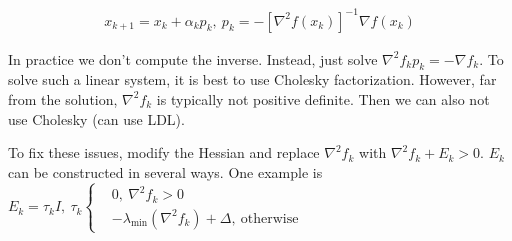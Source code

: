 \documentclass{article}
\begin{document}
\begin{align*}
  x_{k+1} = x_k + \alpha_k p_k,\  p_k = -[\nabla ^2 f(x_k)]^{-1} \nabla f(x_k)
\end{align*}

In practice we don't compute the inverse. Instead, just solve $\nabla ^2 f_k p_k = -\nabla f_k$. To solve such
a linear system, it is best to use Cholesky factorization. However, far from the solution, $\nabla ^2 f_k$ is typically not positive definite. Then we can 
also not use Cholesky (can use LDL). 

\medskip To fix these issues, modify the Hessian and replace $\nabla ^2 f_k$ with $\nabla ^2 f_k + E_k > 0 $. $E_k$ can be constructed in several ways. 
One example is $E_k = \tau_k I,\  \tau_k \left\{
  \begin{aligned}
    &0,\  \nabla ^2 f_k > 0 \\ 
    &-\lambda_{\min} (\nabla ^2 f_k) + \Delta,\  \text{otherwise}
  \end{aligned}
\right.$
\end{document}
